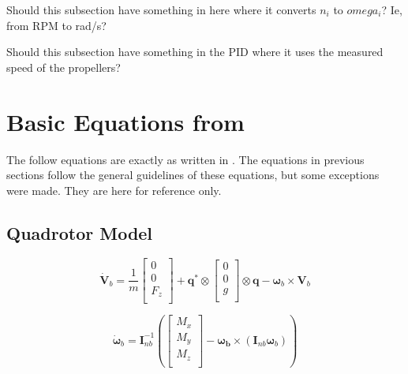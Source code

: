 \documentclass{article}
\numberwithin{equation}{section} %
\begin{document}
Should this subsection have something in here where it converts $n_i$ to $omega_i$? Ie, from RPM to rad/s?

Should this subsection have something in the PID where it uses the measured speed of the propellers?












\section{Basic Equations from \cite{stingu09}}

The follow equations are exactly as written in \cite{stingu09}. The equations in previous sections follow the general guidelines of these equations, but some exceptions were made. They are here for reference only.

\subsection{Quadrotor Model}

\begin{equation}
\dot{\boldsymbol{V}}_b = \frac{1}{m} 
	\left[
		\begin{array}{c}
			0 \\
			0 \\
			F_z \\
		\end{array}
	\right]
	+ \boldsymbol{q}^* \otimes
		\left[
			\begin{array}{c}
				0 \\
				0 \\
				g \\
			\end{array}
		\right]
	\otimes \boldsymbol{q} - \boldsymbol{\omega}_b \times \boldsymbol{V}_b
\end{equation}

\begin{equation}
\dot{\boldsymbol{\omega}}_b = \boldsymbol{I}^{-1}_{nb}
	\left(
		\left[
			\begin{array}{c}
				M_x \\
				M_y \\
				M_z \\
			\end{array}
		\right]
		- \boldsymbol{\omega_b} \times \left( \boldsymbol{I}_{nb} \boldsymbol{\omega}_b \right)
	\right)
\end{equation}
\end{document}
